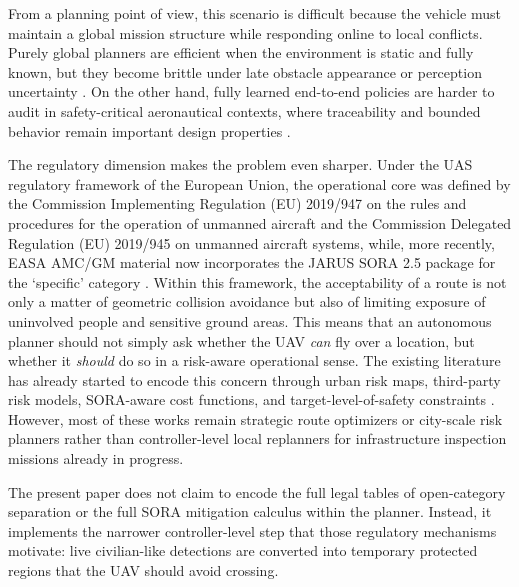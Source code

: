 \documentclass[journal,twoside,web]{ieeecolor}
\begin{document}
From a planning point of view, this scenario is difficult because the vehicle must maintain a global mission structure while responding online to local conflicts. Purely global planners are efficient when the environment is static and fully known, but they become brittle under late obstacle appearance or perception uncertainty \cite{debnath2024review,meng2025advances}. On the other hand, fully learned end-to-end policies are harder to audit in safety-critical aeronautical contexts, where traceability and bounded behavior remain important design properties \cite{EASA_AI_Roadmap_2.0}.

The regulatory dimension makes the problem even sharper. Under the UAS regulatory framework of the European Union, the operational core was defined by the Commission Implementing Regulation (EU) 2019/947 on the rules and procedures for the operation of unmanned aircraft and the Commission Delegated Regulation (EU) 2019/945 on unmanned aircraft systems, while, more recently, EASA AMC/GM material now incorporates the JARUS SORA 2.5 package for the `specific' category \cite{EU2019_947,EU2019_945,JARUS_SORA_2_5_2024,EASA_AMC_GM_SORA25_2025}. Within this framework, the acceptability of a route is not only a matter of geometric collision avoidance but also of limiting exposure of uninvolved people and sensitive ground areas. This means that an autonomous planner should not simply ask whether the UAV \emph{can} fly over a location, but whether it \emph{should} do so in a risk-aware operational sense. The existing literature has already started to encode this concern through urban risk maps, third-party risk models, SORA-aware cost functions, and target-level-of-safety constraints \cite{primatesta2019riskaware,primatesta2020groundrisk,pang2022integrated,tang2023thirdparty,zhang2023groundrisk,heinze2023sora,brassel2025riskaware}. However, most of these works remain strategic route optimizers or city-scale risk planners rather than controller-level local replanners for infrastructure inspection missions already in progress.

 The present paper does not claim to encode the full legal tables of open-category separation or the full SORA mitigation calculus within the planner. Instead, it implements the narrower controller-level step that those regulatory mechanisms motivate: live civilian-like detections are converted into temporary protected regions that the UAV should avoid crossing.

\end{document}

